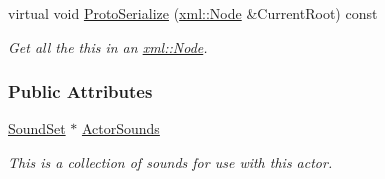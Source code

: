 \begin{DoxyCompactItemize}
virtual void \hyperlink{classphys_1_1ActorBase_a402b408b6ebb5ce82181a75dff14887f}{ProtoSerialize} (\hyperlink{classphys_1_1xml_1_1Node}{xml::Node} \&CurrentRoot) const 
\begin{DoxyCompactList}\small\item\em Get all the this in an \hyperlink{classphys_1_1xml_1_1Node}{xml::Node}. \item\end{DoxyCompactList}\end{DoxyCompactItemize}
\subsubsection*{Public Attributes}
\begin{DoxyCompactItemize}
\item 
\hypertarget{classphys_1_1ActorBase_a2d56e2b3470bfc7dfc6d9ce8c4158d81}{
\hyperlink{classphys_1_1SoundSet}{SoundSet} $\ast$ \hyperlink{classphys_1_1ActorBase_a2d56e2b3470bfc7dfc6d9ce8c4158d81}{ActorSounds}}
\label{classphys_1_1ActorBase_a2d56e2b3470bfc7dfc6d9ce8c4158d81}

\begin{DoxyCompactList}\small\item\em This is a collection of sounds for use with this actor. \item\end{DoxyCompactList}\end{DoxyCompactItemize}
